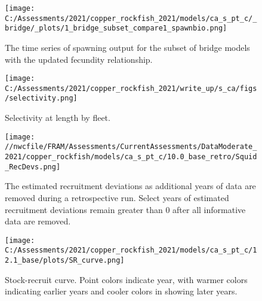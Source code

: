 \documentclass[11pt,
  english,
  a4paper,
]{article}
\begin{document}
\tagmcend\tagstructend


\begin{figure}
\centering
\texttt{[image: C:/Assessments/2021/copper\_rockfish\_2021/models/ca\_s\_pt\_c/\_bridge/\_plots/1\_bridge\_subset\_compare1\_spawnbio.png]}
\caption{The time series of spawning output for the subset of bridge models with the updated fecundity relationship.\label{fig:bridge-ssb-2}}
\end{figure}

\tagmcend\tagstructend


\begin{figure}
\centering
\texttt{[image: C:/Assessments/2021/copper\_rockfish\_2021/write\_up/s\_ca/figs/selectivity.png]}
\caption{Selectivity at length by fleet.\label{fig:selex}}
\end{figure}

\tagmcend\tagstructend


\begin{figure}
\centering
\texttt{[image: //nwcfile/FRAM/Assessments/CurrentAssessments/DataModerate\_2021/copper\_rockfish/models/ca\_s\_pt\_c/10.0\_base\_retro/Squid\_RecDevs.png]}
\caption{The estimated recruitment deviations as additional years of data are removed during a retrospective run. Select years of estimated recruitment deviations remain greater than 0 after all informative data are removed.\label{fig:squid-rec}}
\end{figure}

\tagmcend\tagstructend


\begin{figure}
\centering
\texttt{[image: C:/Assessments/2021/copper\_rockfish\_2021/models/ca\_s\_pt\_c/12.1\_base/plots/SR\_curve.png]}
\caption{Stock-recruit curve. Point colors indicate year, with warmer colors indicating earlier years and cooler colors in showing later years.\label{fig:bh-curve}}
\end{figure}
\end{document}

